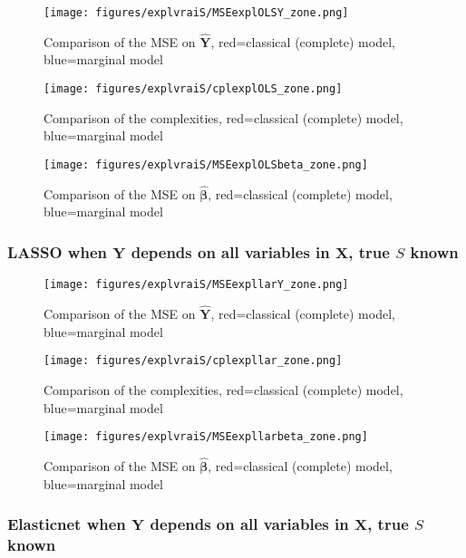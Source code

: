 \documentclass[12pt,a4paper]{report}
\begin{document}
	\begin{figure}[h!]
	\centering
		  \texttt{[image: figures/explvraiS/MSEexplOLSY\_zone.png]}
		\caption{Comparison of the MSE on $\hat{\boldsymbol{Y}}$, red=classical (complete) model, blue=marginal model}\label{MSEexplOLSY_zone}
	\end{figure}
	\begin{figure}[h!]
	\centering
		  \texttt{[image: figures/explvraiS/cplexplOLS\_zone.png]}
		\caption{Comparison of the complexities, red=classical (complete) model, blue=marginal model}\label{cplexplOLS_zone}
	\end{figure}
	\begin{figure}[h!]
	\centering
		  \texttt{[image: figures/explvraiS/MSEexplOLSbeta\_zone.png]}
		\caption{Comparison of the MSE on $\hat{\boldsymbol{\beta}}$, red=classical (complete) model, blue=marginal model}\label{MSEexplOLSbeta_zone}
	\end{figure}
	\FloatBarrier
\newpage
\subsubsection{LASSO when $\boldsymbol{Y}$ depends on all variables in $\boldsymbol{X}$, true $S$ known}
	\begin{figure}[h!]
	\centering
		  \texttt{[image: figures/explvraiS/MSEexpllarY\_zone.png]}
		\caption{Comparison of the MSE on $\hat{\boldsymbol{Y}}$, red=classical (complete) model, blue=marginal model}\label{MSEexpllarY_zone}
	\end{figure}
	\begin{figure}[h!]
	\centering
		  \texttt{[image: figures/explvraiS/cplexpllar\_zone.png]}
		\caption{Comparison of the complexities, red=classical (complete) model, blue=marginal model}\label{cplexpllar_zone}
	\end{figure}
	\begin{figure}[h!]
	\centering
		  \texttt{[image: figures/explvraiS/MSEexpllarbeta\_zone.png]}
		\caption{Comparison of the MSE on $\hat{\boldsymbol{\beta}}$, red=classical (complete) model, blue=marginal model}\label{MSEexpllarbeta_zone}
	\end{figure}
	\FloatBarrier
\newpage
\subsubsection{Elasticnet when $\boldsymbol{Y}$ depends on all variables in $\boldsymbol{X}$, true $S$ known}
\end{document}

